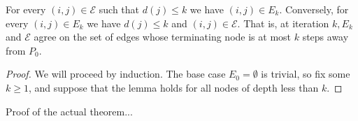 \documentclass[12pt]{article}
\def\pwgc{\overset{\text{PW}}{\rightarrow}}  %
\def\npwgc{\overset{\text{PW}}{\nrightarrow}}  %
\newcommand{\pa}[1]{pa(#1)}  %
\newcommand{\anc}[1]{\mathcal{A}(#1)}  %
\begin{document}
\begin{lemma}
  For every $(i, j) \in \mathcal{E}$ such that $d(j) \le k$ we have
  $(i, j) \in E_k$.  Conversely, for every $(i, j) \in E_{k}$ we have
  $d(j) \le k$ and $(i, j) \in \mathcal{E}$.  That is, at iteration
  $k, E_k$ and $\mathcal{E}$ agree on the set of edges whose
  terminating node is at most $k$ steps away from $P_0$.
\end{lemma}
\begin{proof}
  We will proceed by induction.  The base case $E_0 = \emptyset$ is
  trivial, so fix some $k \ge 1$, and suppose that the lemma holds for
  all nodes of depth less than $k$.
\end{proof}
  


Proof of the actual theorem...
\end{document}
